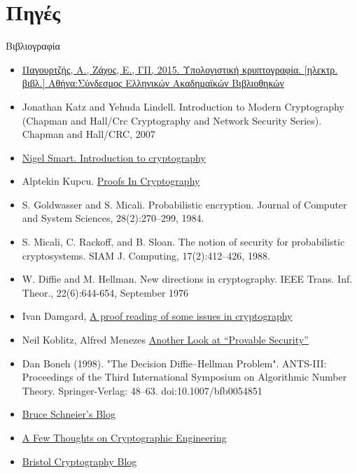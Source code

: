 \documentclass[handout]{beamer}
\begin{document}
\section{Πηγές}
\begin{frame}{Βιβλιογραφία}
\begin{tiny}
\begin{itemize}
\item \href{ http://hdl.handle.net/11419/5439}{Παγουρτζής, Α., Ζάχος, Ε., ΓΠ, 2015. Υπολογιστική κρυπτογραφία. [ηλεκτρ. βιβλ.] Αθήνα:Σύνδεσμος Ελληνικών Ακαδημαϊκών Βιβλιοθηκών}
\item Jonathan Katz and Yehuda Lindell. Introduction to Modern Cryptography (Chapman and Hall/Crc Cryptography and Network Security Series). Chapman
and Hall/CRC, 2007
\item \href{http://goo.gl/b75I29}{Nigel Smart. Introduction to cryptography} 

\item Alptekin Kupcu. \href{https://goo.gl/l4GT2u}{Proofs In Cryptography}

\item S. Goldwasser and S. Micali. Probabilistic encryption. Journal of Computer and System Sciences, 28(2):270–299, 1984.
\item S. Micali, C. Rackoff, and B. Sloan. The notion of security for probabilistic cryptosystems. SIAM J. Computing, 17(2):412–426, 1988.

\item W. Diffie and M. Hellman. New directions in cryptography. IEEE Trans. Inf. Theor., 22(6):644-654, September 1976

\item Ivan Damgard, \href{http://goo.gl/mgAXC8}{A proof reading of some issues in cryptography}
\item Neil Koblitz, Alfred Menezes \href{https://goo.gl/GJNklR}{Another Look at “Provable Security”}

\item Dan Boneh (1998). "The Decision Diffie–Hellman Problem". ANTS-III: Proceedings of the Third International Symposium on Algorithmic Number Theory. Springer-Verlag: 48–63. doi:10.1007/bfb0054851

\item \href{https://www.schneier.com/}{Bruce Schneier's Blog}
\item \href{http://blog.cryptographyengineering.com/}{A Few Thoughts on Cryptographic Engineering}
\item \href{http://goo.gl/whmmb9}{Bristol Cryptography Blog}
 
\end{itemize}
\end{tiny}
\end{frame}

 
\end{document}
